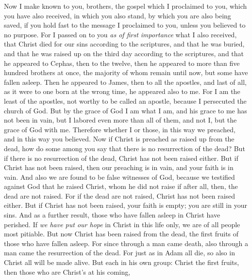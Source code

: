\begin{biblechapter} %
 Now I make known to you, brothers, the gospel which I proclaimed to you, which you have also received, in which you also stand,
\verse by which you are also being saved, if you hold fast to the message I proclaimed to you, unless you believed to no purpose.
\verse For I passed on to you \textit{as of first importance} what I also received, that Christ died for our sins according to the scriptures,
\verse and that he was buried, and that he was raised up on the third day according to the scriptures,
\verse and that he appeared to Cephas, then to the twelve,
\verse then he appeared to more than five hundred brothers at once, the majority of whom remain until now, but some have fallen asleep.
\verse Then he appeared to James, then to all the apostles,
\verse and last of all, as it were to one born at the wrong time, he appeared also to me.
\verse For I am the least of the apostles, not worthy to be called an apostle, because I persecuted the church of God.
\verse But by the grace of God I am what I am, and his grace to me has not been in vain, but I labored even more than all of them, and not I, but the grace of God with me.
\verse Therefore whether I or those, in this way we preached, and in this way you believed.
 Now if Christ is preached as raised up from the dead, how do some among you say that there is no resurrection of the dead?
\verse But if there is no resurrection of the dead, Christ has not been raised either.
\verse But if Christ has not been raised, then our preaching is in vain, and your faith is in vain.
\verse And also we are found to be false witnesses of God, because we testified against God that he raised Christ, whom he did not raise if after all, then, the dead are not raised.
\verse For if the dead are not raised, Christ has not been raised either.
\verse But if Christ has not been raised, your faith is empty; you are still in your sins.
\verse And as a further result, those who have fallen asleep in Christ have perished.
\verse If \textit{we have put our hope} in Christ in this life only, we are of all people most pitiable.
\verse But now Christ has been raised from the dead, the first fruits of those who have fallen asleep.
\verse For since through a man came death, also through a man came the resurrection of the dead.
\verse For just as in Adam all die, so also in Christ all will be made alive.
\verse But each in his own group: Christ the first fruits, then those who are Christ’s at his coming,

\end{biblechapter}
